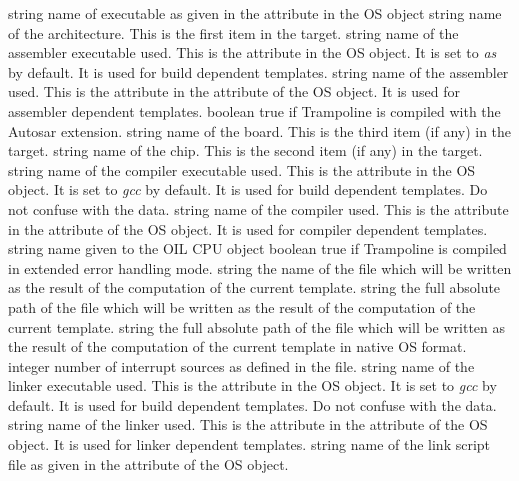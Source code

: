 {string}
{name of executable as given in the  attribute in the OS object} 
{string}
{name of the architecture. This is the first item in the target.} 
{string}
{name of the assembler executable used. This is the  attribute in the OS object. It is set to {\em as} by default. It is used for build dependent templates.} 
{string}
{name of the assembler used. This is the  attribute in the  attribute of the OS object. It is used for assembler dependent templates.} 
{boolean}
{true if Trampoline is compiled with the Autosar extension.} 
{string}
{name of the board. This is the third item (if any) in the target.} 
{string}
{name of the chip. This is the second item (if any) in the target.} 
{string}
{name of the compiler executable used. This is the  attribute in the OS object. It is set to {\em gcc} by default. It is used for build dependent templates. Do not confuse with the  data.} 
{string}
{name of the compiler used. This is the  attribute in the  attribute of the OS object. It is used for compiler dependent templates.} 
{string}
{name given to the OIL CPU object} 
{boolean}
{true if Trampoline is compiled in extended error handling mode.} 
{string}
{the name of the file which will be written as the result of the computation of the current template.} 
{string}
{the full absolute path of the file which will be written as the result of the computation of the current template.} 
{string}
{the full absolute path of the file which will be written as the result of the computation of the current template in native OS format.} 
{integer}
{number of interrupt sources as defined in the  file.} 
{string}
{name of the linker executable used. This is the  attribute in the OS object. It is set to {\em gcc} by default. It is used for build dependent templates. Do not confuse with the  data.} 
{string}
{name of the linker used. This is the  attribute in the  attribute of the OS object. It is used for linker dependent templates.} 
{string}
{name of the link script file as given in the  attribute of the OS object.} 

